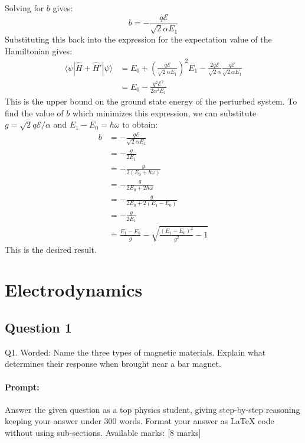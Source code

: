 \documentclass{article}
\begin{document}
Solving for $b$ gives:
\begin{equation*}
b = -\frac{q \mathcal{E}}{\sqrt{2} \alpha E_1}
\end{equation*}
Substituting this back into the expression for the expectation value of the Hamiltonian gives:
\begin{align*}
\langle \psi | \hat{H} + \hat{H}' | \psi \rangle &= E_0 + \left( \frac{q \mathcal{E}}{\sqrt{2} \alpha E_1} \right)^2 E_1 - \frac{2q \mathcal{E}}{\sqrt{2} \alpha} \frac{q \mathcal{E}}{\sqrt{2} \alpha E_1} \\
&= E_0 - \frac{q^2 \mathcal{E}^2}{2 \alpha^2 E_1}
\end{align*}
This is the upper bound on the ground state energy of the perturbed system.  To find the value of $b$ which minimizes this expression, we can substitute $g = \sqrt{2} q \mathcal{E} / \alpha$ and $E_1 - E_0 = \hbar \omega$ to obtain:
\begin{align*}
b &= -\frac{q \mathcal{E}}{\sqrt{2} \alpha E_1} \\
&= -\frac{g}{2 E_1} \\
&= -\frac{g}{2 (E_0 + \hbar \omega)} \\
&= -\frac{g}{2 E_0 + 2 \hbar \omega} \\
&= -\frac{g}{2 E_0 + 2 (E_1 - E_0)} \\
&= -\frac{g}{2 E_1} \\
&= \frac{E_1 - E_0}{g} - \sqrt{\frac{(E_1 - E_0)^2}{g^2} - 1}
\end{align*}
This is the desired result.


\section{Electrodynamics}

\subsection{Question 1}
Q1. Worded:  
Name the three types of magnetic materials. Explain what determines their response when brought near a bar magnet.  

\paragraph{Prompt: \\} 
Answer the given question as a top physics student, giving step-by-step reasoning keeping your answer under 300 words. Format your answer as LaTeX code without using sub-sections. Available marks: [8 marks]
\end{document}
